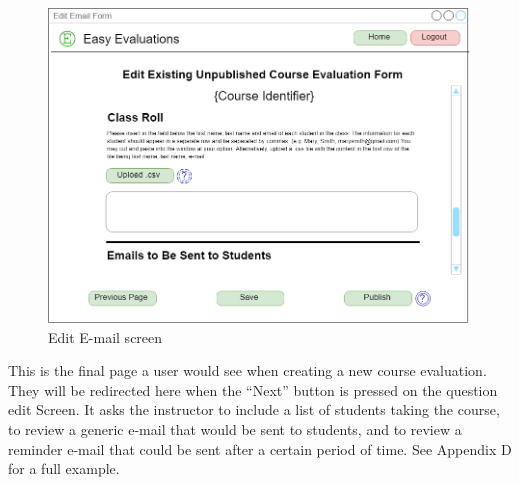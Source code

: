 \documentclass{article}
\begin{document}
\newpage

\begin{center}
\begin{figure}[H]
    \centering
    \caption{Edit E-mail screen}
    \includegraphics[width=6.5in]{images/emails_screen.png}
\end{figure}
\end{center}

This is the final page a user would see when creating a new course evaluation. They will be redirected here when the ``Next'' button is pressed on the question edit Screen. It asks the instructor to include a list of students taking the course, to review a generic e-mail that would be sent to students, and to review a reminder e-mail that could be sent after a certain period of time. See Appendix D for a full example.

\newpage
\end{document}
